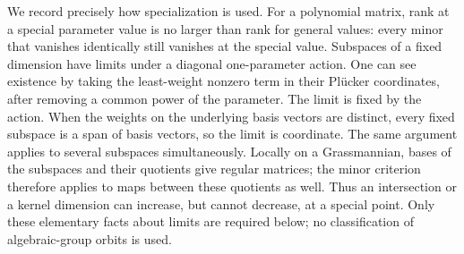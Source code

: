 \documentclass[11pt]{amsart}
\theoremstyle{remark}
\numberwithin{equation}{section}
\begin{document}
We record precisely how specialization is used. For a polynomial matrix,
rank at a special parameter value is no larger than rank for general
values: every minor that vanishes identically still vanishes at the
special value. Subspaces of a fixed dimension have limits under a diagonal
one-parameter action. One can see existence by taking the least-weight
nonzero term in their Pl\"ucker coordinates, after removing a common power
of the parameter. The limit is fixed by the action. When the weights on
the underlying basis vectors are distinct, every fixed subspace is a span
of basis vectors, so the limit is coordinate. The same argument applies
to several subspaces simultaneously. Locally on a Grassmannian, bases of
the subspaces and their quotients give regular matrices; the minor
criterion therefore applies to maps between these quotients as well.
Thus an intersection or a kernel dimension can increase, but cannot
decrease, at a special point. Only these elementary facts about limits
are required below; no classification of algebraic-group orbits is used.
\end{document}
